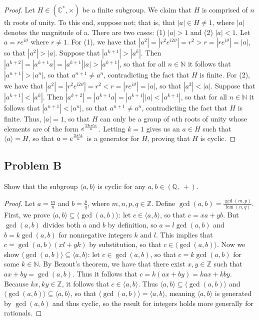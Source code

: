 \documentclass{article}
\DeclareMathOperator{\lcm}{lcm}
\begin{document}
\begin{proof}

Let $H \in \left(\mathbb{C}^{\ast},\times\right)$ be a finite subgroup. We claim that $H$ is comprised of $n$th roots of unity. To this end, suppose not; that is, that $|a| \in H \neq 1$, where $|a|$ denotes the magnitude of a. There are two cases: (1) $|a| > 1$ and (2) $|a| < 1$. Let $a = re^{i\vartheta}$ where $r \neq 1$. For (1), we have that $|a^2| = |r^2e^{i2\vartheta}| = r^2 > r =  |re^{i\vartheta}| = |a|$, so that $|a^2| > |a|$. Suppose that $|a^{k+1}| > |a^k|$. Then $|a^{k+2}| = |a^{k+1}a| = |a^{k+1}||a| > |a^{k+1}|$, so that for all $n \in \mathbb{N}$ it follows that $|a^{n+1}| > |a^n|$, so that $a^{n+1} \neq a^n$, contradicting the fact that $H$ is finite. For (2), we have that $|a^2| = |r^2e^{i2\vartheta}| = r^2 < r =  |re^{i\vartheta}| = |a|$, so that $|a^2| < |a|$. Suppose that $|a^{k+1}| < |a^k|$. Then $|a^{k+2}| = |a^{k+1}a| = |a^{k+1}||a| < |a^{k+1}|$, so that for all $n \in \mathbb{N}$ it follows that $|a^{n+1}| < |a^n|$, so that $a^{n+1} \neq a^n$, contradicting the fact that $H$ is finite. Thus, $|a| = 1$, so that $H$ can only be a group of $n$th roots of unity whose elements are of the form $e^{\frac{2k\pi\i}{n}}$. Letting $k = 1$ gives us an $a \in H$ such that $\langle a \rangle = H$, so that $a = e^{\frac{2\pi\i}{n}}$ is a generator for $H$, proving that $H$ is cyclic.

\end{proof}

\subsection*{Problem B}
Show that the subgroup $\langle a,b\rangle$ is cyclic for any $a,b\in\left(\mathbb{Q},\:+\right)$.

\begin{proof}

Let $a = \frac{m}{n}$ and $b = \frac{p}{q}$, where $m, n, p, q \in \mathbb{Z}$. Define $\gcd{(a, b)} = \frac{\gcd{(m, p)}}{\lcm{(n, q)}}$. First, we prove $\langle a, b \rangle \subseteq \langle \gcd{(a, b)} \rangle$: let $c \in \langle a, b \rangle$, so that $c = xa+yb$. But $\gcd{(a, b)}$ divides both $a$ and $b$ by definition, so $a=l\gcd{(a, b)}$ and $b=k\gcd{(a, b)}$ for nonnegative integers $k$ and $l$. This implies that $c = \gcd{(a, b)}(xl + yk)$ by substitution, so that $c \in \langle \gcd{(a, b)} \rangle$. Now we show $\langle \gcd{(a, b)} \rangle \subseteq \langle a, b \rangle$: let $c \in \gcd{(a, b)}$, so that $c = k\gcd{(a, b)}$ for some $k \in \mathbb{N}$. By Bezout's theorem, we have that there exist $x, y \in \mathbb{Z}$ such that $ax + by = \gcd{(a, b)}$. Thus it follows that $c = k(ax + by) = kax + kby$. Because $kx, ky \in \mathbb{Z}$, it follows that $c \in \langle a, b \rangle$. Thus $\langle a, b \rangle \subseteq \langle \gcd{(a, b)} \rangle$ and $\langle \gcd{(a, b)} \rangle \subseteq \langle a, b \rangle$, so that $\langle \gcd{(a, b)} \rangle = \langle a, b \rangle$, meaning $\langle a, b \rangle$ is generated by $\gcd{(a, b)}$ and thus cyclic, so the result for integers holds more generally for rationals.

\end{proof}
\end{document}
